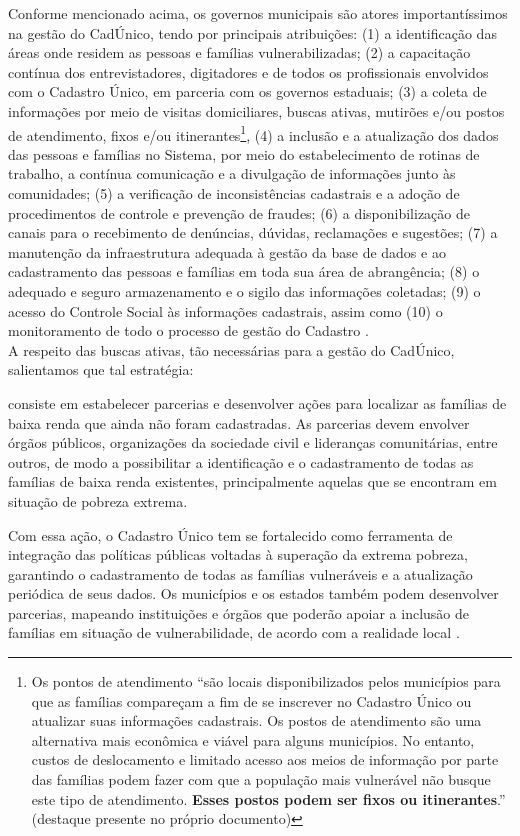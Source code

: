 \documentclass[12pt]{article}
\begin{document}
Conforme mencionado acima, os governos municipais são atores importantíssimos na gestão do CadÚnico, tendo por principais atribuições: (1) a identificação das áreas onde residem as pessoas e famílias vulnerabilizadas; (2) a capacitação contínua dos entrevistadores, digitadores e de todos os profissionais envolvidos com o Cadastro Único, em parceria com os governos estaduais; (3) a coleta de informações por meio de visitas domiciliares, buscas ativas, mutirões e/ou postos de atendimento, fixos e/ou itinerantes\footnote{Os pontos de atendimento ``são locais disponibilizados pelos municípios para que as famílias compareçam a fim de se inscrever no Cadastro Único ou atualizar suas informações cadastrais. Os postos de atendimento são uma alternativa mais econômica e viável para alguns municípios. No entanto, custos de deslocamento e limitado acesso aos meios de informação por parte das famílias podem fazer com que a população mais vulnerável não busque este tipo de atendimento. \textbf{Esses postos podem ser fixos ou itinerantes}.” \citep[p.~30]{cadunico} (destaque presente no próprio documento)}, (4) a inclusão e a atualização dos dados das pessoas e famílias no Sistema, por meio do estabelecimento de rotinas de trabalho, a contínua comunicação e a divulgação de informações junto às comunidades; (5) a verificação de inconsistências cadastrais e a adoção de procedimentos de controle e prevenção de fraudes; (6) a disponibilização de canais para o recebimento de denúncias, dúvidas, reclamações e sugestões; (7) a manutenção da infraestrutura adequada à gestão da base de dados e ao cadastramento das pessoas e famílias em toda sua área de abrangência; (8) o adequado e seguro armazenamento e o sigilo das informações coletadas; (9) o acesso do Controle Social às informações cadastrais, assim como (10) o monitoramento de todo o processo de gestão do Cadastro \citep{cadunico}.\\

A respeito das buscas ativas, tão necessárias para a gestão do CadÚnico, salientamos que tal estratégia:

\begin{trivlist}\leftskip=2.5cm
\item consiste em estabelecer parcerias e desenvolver ações para localizar as famílias de baixa renda que ainda não foram cadastradas. As parcerias devem envolver órgãos públicos, organizações da sociedade civil e lideranças comunitárias, entre outros, de modo a possibilitar a identificação e o cadastramento de todas as famílias de baixa renda existentes, principalmente aquelas que se encontram em situação de pobreza extrema.
 \vspace{0.5cm}
\item Com essa ação, o Cadastro Único tem se fortalecido como ferramenta de integração das políticas públicas voltadas à superação da extrema pobreza, garantindo o cadastramento de todas as famílias vulneráveis e a atualização periódica de seus dados.
 \vspace{0.5cm}
Os municípios e os estados também podem desenvolver parcerias, mapeando instituições e órgãos que poderão apoiar a inclusão de famílias em situação de vulnerabilidade, de acordo com a realidade local \citep[p.~28]{cadunico}.
\end{trivlist}
\end{document}
